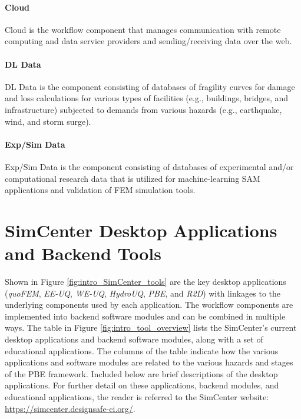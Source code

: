 \paragraph{Cloud} Cloud is the workflow component that manages communication with remote computing and data service providers and sending/receiving data over the web.

\paragraph{DL Data} DL Data is the component consisting of databases of fragility curves for damage and loss calculations for various types of facilities (e.g., buildings, bridges, and infrastructure) subjected to demands from various hazards (e.g., earthquake, wind, and storm surge).

\paragraph{Exp/Sim Data} Exp/Sim Data is the component consisting of databases of experimental and/or computational research data that is utilized for machine-learning SAM applications and validation of FEM simulation tools.

\section{SimCenter Desktop Applications and Backend Tools}

Shown in Figure \ref{fig:intro_SimCenter_tools} are the key desktop applications (\emph{quoFEM}, \emph{EE-UQ}, \emph{WE-UQ}, \emph{HydroUQ}, \emph{PBE}, and \emph{R2D}) with linkages to the underlying components used by each application. The workflow components are implemented into backend software modules and can be combined in multiple ways.  The table in Figure \ref{fig:intro_tool_overview} lists the SimCenter’s current desktop applications and backend software modules, along with a set of educational applications.  The columns of the table indicate how the various applications and software modules are related to the various hazards and stages of the PBE framework. Included below are brief descriptions of the desktop applications.  For further detail on these applications, backend modules, and educational applications, the reader is referred to the SimCenter website: \url{https://simcenter.designsafe-ci.org/}. 

